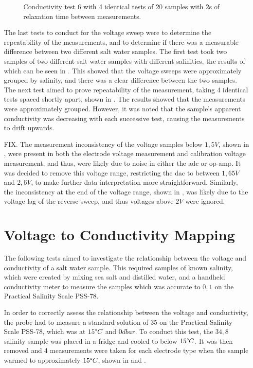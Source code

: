 \begin{figure}[ht]
\begin{minipage}{0.5\textwidth}
        \caption{Conductivity test 6 with 4 identical tests of 20 samples with 2s of relaxation time between measurements.}
        \label{fig:test8} %
    \end{minipage}
\end{figure}

The last tests to conduct for the voltage sweep were to determine the repeatability of the measurements, and to determine if there was a measurable difference between two different salt water samples.
The first test took two samples of two different salt water samples with different salinities, the results of which can be seen in .
This showed that the voltage sweeps were approximately grouped by salinity, and there was a clear difference between the two samples.
The next test aimed to prove repeatability of the measurement, taking 4 identical tests spaced shortly apart, shown in .
The results showed that the measurements were approximately grouped.
However, it was noted that the sample's apparent conductivity was decreasing with each successive test, causing the measurements to drift upwards.

FIX.
The measurement inconsistency of the voltage samples below $1,5V$, shown in , were present in both the electrode voltage measurement and calibration voltage measurement, and thus, were likely due to noise in either the \gls{adc} or op-amp.
It was decided to remove this voltage range, restricting the \gls{dac} to between $1,65V$ and $2,6V$, to make further data interpretation more straightforward.
Similarly, the inconsistency at the end of the voltage range, shown in , was likely due to the voltage lag of the reverse sweep, and thus voltages above $2V$ were ignored.

\section{Voltage to Conductivity Mapping}\label{sec:voltage-conductivity-mapping}

The following tests aimed to investigate the relationship between the voltage and conductivity of a salt water sample.
This required samples of known salinity, which were created by mixing sea salt and distilled water, and a handheld conductivity meter to measure the samples which was accurate to $0,1$ on the Practical Salinity Scale PSS-78.

In order to correctly assess the relationship between the voltage and conductivity, the probe had to measure a standard solution of 35 on the Practical Salinity Scale PSS-78, which was at $15\degree C$ and $0dbar$.
To conduct this test, the $34,8$ salinity sample was placed in a fridge and cooled to below $15\degree C$.
It was then removed and 4 measurements were taken for each electrode type when the sample warmed to approximately $15\degree C$, shown in  and .

